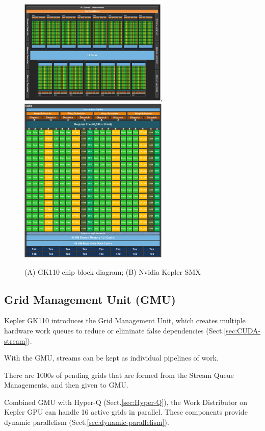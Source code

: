 \begin{figure}[hbt]
  \centerline{\includegraphics[height=5cm,
    angle=0]{./images/GK110_chipblock.eps}, \includegraphics[height=8cm,
    angle=0]{./images/Kepler_SMX.eps}}
  \caption{(A) GK110 chip block diagram; (B) Nvidia Kepler SMX}
  \label{fig:Kepler_SMX}
\end{figure}


\subsection{Grid Management Unit (GMU)}
\label{sec:Grid-Management-Unit-Kepler}
\label{sec:GMU-Kepler}

Kepler GK110 introduces the Grid Management Unit, which creates multiple
hardware work queues to reduce or eliminate false dependencies (Sect.\ref{sec:CUDA-stream}).

With the GMU, streams can be kept as individual pipelines of work.

There are 1000s of pending grids that are formed from the Stream Queue Managements, and then given to GMU.

Combined GMU with Hyper-Q (Sect.\ref{sec:Hyper-Q}),  the Work Distributor on
Kepler GPU can handle 16 active grids in parallel.
These components provide dynamic parallelism
(Sect.\ref{sec:dynamic-parallelism}).


